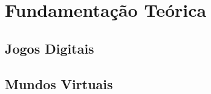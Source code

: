 \chapter{Fundamentação Teórica}

\lipsum[1-3]

\section{Jogos Digitais}

\lipsum[4-7]

\section{Mundos Virtuais}

\lipsum[8-10]
